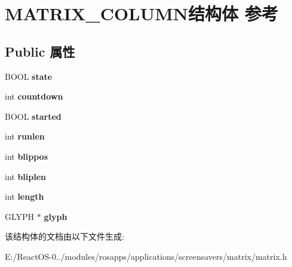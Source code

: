 \hypertarget{struct_m_a_t_r_i_x___c_o_l_u_m_n}{}\section{M\+A\+T\+R\+I\+X\+\_\+\+C\+O\+L\+U\+M\+N结构体 参考}
\label{struct_m_a_t_r_i_x___c_o_l_u_m_n}
\subsection*{Public 属性}
\begin{DoxyCompactItemize}
\item 
\mbox{\label{struct_m_a_t_r_i_x___c_o_l_u_m_n_ab63b949370eaabf35cc1ff9ab6709ace}} 
B\+O\+OL {\bfseries state}
\item 
\mbox{\label{struct_m_a_t_r_i_x___c_o_l_u_m_n_a1cf1aff4703ef6c5dc2eac918b09b3fd}} 
int {\bfseries countdown}
\item 
\mbox{\label{struct_m_a_t_r_i_x___c_o_l_u_m_n_af791442703a549385a005b3065197cf1}} 
B\+O\+OL {\bfseries started}
\item 
\mbox{\label{struct_m_a_t_r_i_x___c_o_l_u_m_n_adf402c384f79c3cca8d6cfb3fd4c9f2f}} 
int {\bfseries runlen}
\item 
\mbox{\label{struct_m_a_t_r_i_x___c_o_l_u_m_n_a8defda617e1a54aae817040a1ae6a4fc}} 
int {\bfseries blippos}
\item 
\mbox{\label{struct_m_a_t_r_i_x___c_o_l_u_m_n_ae250b08725630486a7e7ed5715ec370f}} 
int {\bfseries bliplen}
\item 
\mbox{\label{struct_m_a_t_r_i_x___c_o_l_u_m_n_ae4b7eb7e5785a64ebf6d8007f2d32e2e}} 
int {\bfseries length}
\item 
\mbox{\label{struct_m_a_t_r_i_x___c_o_l_u_m_n_ab1179a726b5e04f3d7fe3a29938bca81}} 
G\+L\+Y\+PH $\ast$ {\bfseries glyph}
\end{DoxyCompactItemize}


该结构体的文档由以下文件生成\+:\begin{DoxyCompactItemize}
\item 
E\+:/\+React\+O\+S-\/0../modules/rosapps/applications/screensavers/matrix/matrix.\+h\end{DoxyCompactItemize}
